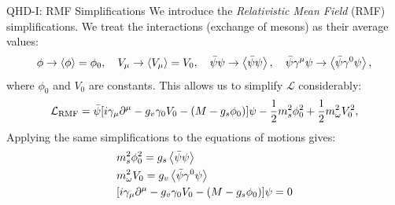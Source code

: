 \documentclass[]{beamer}
\newcommand{\Letter}[1]{\mathcal{#1}}
\newcommand{\Lag}{\Letter{L}}
\newcommand{\p}{\partial}
\begin{document}
    \begin{frame}{QHD-I: RMF Simplifications}
        We introduce the \textit{Relativistic Mean Field} (RMF) simplifications. \pause We treat the interactions (exchange of mesons) as their average values: \pause
        \[\phi \to \expval{\phi} = \phi_0, \quad V_\mu \to \expval{V_\mu} = V_0, \quad \bar\psi\psi \to \expval{\bar\psi\psi}, \quad \bar\psi\gamma^\mu\psi \to \expval{\bar\psi \gamma^0\psi},\]
        where $\phi_0$ and $V_0$ are constants. \pause This allows us to simplify $\Lag$ considerably: \pause
        \begin{align*}
            \Lag_\text{RMF} = \bar\psi \bqty{i\gamma_\mu\p^\mu - g_v \gamma_0 V_0 - (M-g_s\phi_0)} \psi - \frac{1}{2} m_s^2 \phi_0^2 + \frac{1}{2} m_\omega^2 V_0^2,
        \end{align*} \pause
        Applying the same simplifications to the equations of motions gives:
        \begin{align*}
            & m_s^2 \phi_0^2 = g_s\expval{\bar\psi\psi}\\
            & m_\omega^2 V_0 = g_v\expval{\bar\psi\gamma^0\psi}\\
            & \bqty{i\gamma_\mu\p^\mu - g_v\gamma_0 V_0 - (M - g_s\phi_0)}\psi = 0\\
        \end{align*}

    \end{frame}
\end{document}
